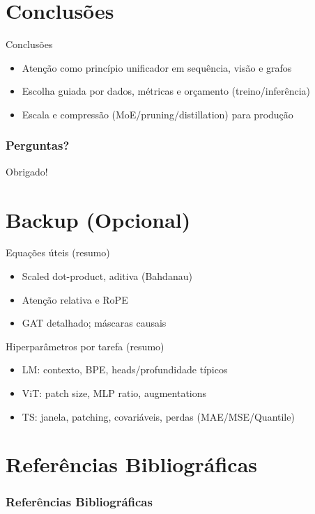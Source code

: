 \documentclass{beamer}
\begin{document}
\section{Conclusões}
\begin{frame}{Conclusões}
\begin{itemize}[<+->]
  \item Atenção como princípio unificador em sequência, visão e grafos
  \item Escolha guiada por dados, métricas e orçamento (treino/inferência)
  \item Escala e compressão (MoE/pruning/distillation) para produção
\end{itemize}
\end{frame}

\backmatter
\begin{frame}
\frametitle{Perguntas?}
\centering
Obrigado!
\end{frame}

\section{Backup (Opcional)}
\begin{frame}{Equações úteis (resumo)}
\small
\begin{itemize}
  \item Scaled dot-product, aditiva (Bahdanau)
  \item Atenção relativa e RoPE
  \item GAT detalhado; máscaras causais
\end{itemize}
\end{frame}

\begin{frame}{Hiperparâmetros por tarefa (resumo)}
\small
\begin{itemize}
  \item LM: contexto, BPE, heads/profundidade típicos
  \item ViT: patch size, MLP ratio, augmentations
  \item TS: janela, patching, covariáveis, perdas (MAE/MSE/Quantile)
\end{itemize}
\end{frame}

\section{Referências Bibliográficas} 
\begin{frame}[allowframebreaks]
  \frametitle{Referências Bibliográficas} 
  
  
\end{frame}
\end{document}
